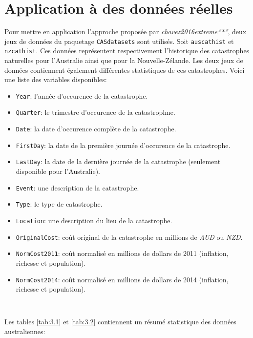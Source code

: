 

\chapter{Application à des données réelles}
\label{chap:application} 

Pour mettre en application l'approche proposée par \textit{chavez2016extreme***}, deux jeux de données du paquetage \texttt{CASdatasets} sont utilisés. Soit \texttt{auscathist} et \texttt{nzcathist}. Ces données représentent respectivement l'historique des catastrophes naturelles pour l'Australie ainsi que pour la Nouvelle-Zélande. Les deux jeux de données contiennent également différentes statistiques de ces catastrophes. Voici une liste des variables disponibles:
\begin{itemize}
\item \texttt{Year}: l'année d'occurence de la catastrophe.
\item \texttt{Quarter}: le trimestre d'occurence de la catastrophne.
\item \texttt{Date}: la date d'occurence complète de la catastrophe.
\item \texttt{FirstDay}: la date de la première journée d'occurence de la catastrophe.
\item \texttt{LastDay}: la date de la dernière journée de la catastrophe (seulement disponible pour l'Australie).
\item \texttt{Event}: une description de la catastrophe.
\item \texttt{Type}: le type de catastrophe.
\item \texttt{Location}: une description du lieu de la catastrophe.
\item \texttt{OriginalCost}: coût original de la catastrophe en millions de \textit{AUD} ou \textit{NZD}.
\item \texttt{NormCost2011}: coût normalisé en millions de dollars de 2011 (inflation, richesse et population).
\item \texttt{NormCost2014}: coût normalisé en millions de dollars de 2014 (inflation, richesse et population).
\end{itemize}
\

Les tables \ref{tab:3.1} et \ref{tab:3.2} contiennent un résumé statistique des données australiennes:

